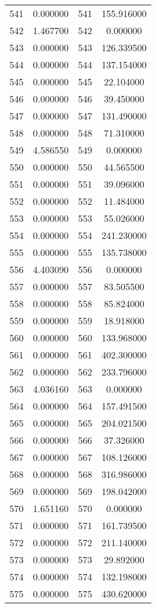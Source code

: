 \documentclass[12pt]{article}
\begin{document}
\begin{longtable}{@{}cccc@{}}
541 & 0.000000 & 541 & 155.916000 \\
542 & 1.467700 & 542 & 0.000000 \\
543 & 0.000000 & 543 & 126.339500 \\
544 & 0.000000 & 544 & 137.154000 \\
545 & 0.000000 & 545 & 22.104000 \\
546 & 0.000000 & 546 & 39.450000 \\
547 & 0.000000 & 547 & 131.490000 \\
548 & 0.000000 & 548 & 71.310000 \\
549 & 4.586550 & 549 & 0.000000 \\
550 & 0.000000 & 550 & 44.565500 \\
551 & 0.000000 & 551 & 39.096000 \\
552 & 0.000000 & 552 & 11.484000 \\
553 & 0.000000 & 553 & 55.026000 \\
554 & 0.000000 & 554 & 241.230000 \\
555 & 0.000000 & 555 & 135.738000 \\
556 & 4.403090 & 556 & 0.000000 \\
557 & 0.000000 & 557 & 83.505500 \\
558 & 0.000000 & 558 & 85.824000 \\
559 & 0.000000 & 559 & 18.918000 \\
560 & 0.000000 & 560 & 133.968000 \\
561 & 0.000000 & 561 & 402.300000 \\
562 & 0.000000 & 562 & 233.796000 \\
563 & 4.036160 & 563 & 0.000000 \\
564 & 0.000000 & 564 & 157.491500 \\
565 & 0.000000 & 565 & 204.021500 \\
566 & 0.000000 & 566 & 37.326000 \\
567 & 0.000000 & 567 & 108.126000 \\
568 & 0.000000 & 568 & 316.986000 \\
569 & 0.000000 & 569 & 198.042000 \\
570 & 1.651160 & 570 & 0.000000 \\
571 & 0.000000 & 571 & 161.739500 \\
572 & 0.000000 & 572 & 211.140000 \\
573 & 0.000000 & 573 & 29.892000 \\
574 & 0.000000 & 574 & 132.198000 \\
575 & 0.000000 & 575 & 430.620000 \\

\end{longtable}
\end{document}
